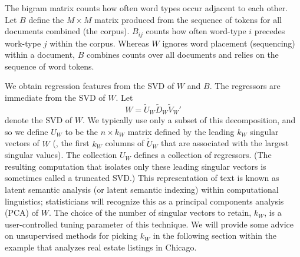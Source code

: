 \documentclass[12pt]{article}
\begin{document}
 
 The bigram matrix counts how often word types occur adjacent to each other.
  Let $B$ define the $M \times M$ matrix produced from the sequence of tokens
 for all documents combined (the corpus).  $B_{ij}$ counts how often word-type
 $i$ precedes work-type $j$ within the corpus.  Whereas $W$ ignores word
 placement (sequencing) within a document, $B$ combines counts over all documents and relies on the sequence of word tokens.


 We obtain regression features from the SVD of $W$ and $B$.  The regressors are immediate from the SVD of $W$.    Let
 \begin{equation}
     W = \tilde{U}_W \tilde{D}_W \tilde{V}_W'   
 \label{eq:svdW}
 \end{equation}
 denote the SVD of $W$. We typically use only a subset of this decomposition, and so  we define $U_W$ to be the $n \times k_W$ matrix defined by the leading $k_W$ singular vectors of $W$ (\ie, the first $k_W$ columns of $\tilde{U}_W$ that are associated with the largest singular values).  The collection $U_W$ defines a collection of regressors.  (The resulting computation that isolates only these leading singular vectors is sometimes called a truncated SVD.)  This representation of text is known as latent semantic analysis (or latent semantic indexing) within computational linguistics; statisticians will recognize this as a principal components analysis (PCA) of $W$.   The choice of the number of singular vectors to retain, $k_W$, is a user-controlled tuning parameter of this technique.  We will provide some advice on unsupervised methods for picking $k_W$ in the following section within the example that analyzes real estate listings in Chicago.  
\end{document}
